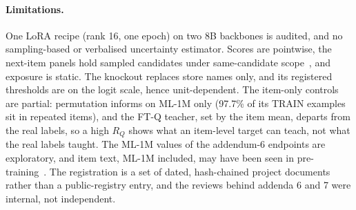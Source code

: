\paragraph{Limitations.}
One LoRA recipe (rank 16, one epoch) on two 8B backbones is audited, and no sampling-based or verbalised uncertainty estimator.
Scores are pointwise, the next-item panels hold sampled candidates under same-candidate scope~\citep{krichene2020sampled}, and exposure
is static. The knockout replaces store names only, and its registered thresholds are on the logit scale, hence unit-dependent. The
item-only controls are partial: permutation informs on ML-1M only (97.7\% of its TRAIN examples sit in repeated items), and the FT-Q
teacher, set by the item mean, departs from the real labels, so a high $R_Q$ shows what an item-level target can teach, not what the
real labels taught. The ML-1M values of the addendum-6 endpoints are exploratory, and item text, ML-1M
included, may have been seen in pre-training~\citep{dipalma2025memorize}. The registration is a set of dated, hash-chained project
documents rather than a public-registry entry, and the reviews behind addenda 6 and 7 were internal, not independent.
